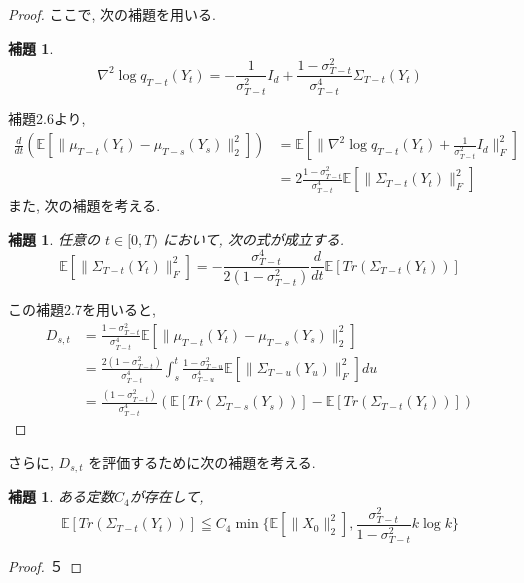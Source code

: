 \documentclass[11pt,a4paper]{ltjsarticle}
\newtheorem{lemma}[theorem]{補題}
\theoremstyle{remark}
\begin{document}
\begin{proof}
    ここで, 次の補題を用いる.
    \begin{lemma}
        \begin{equation}
            \nabla^2\log{q_{T-t}(Y_t)}=-\frac{1}{\sigma^2_{T-t}}I_d+\frac{1-\sigma^2_{T-t}}{\sigma^4_{T-t}}\Sigma_{T-t}(Y_t)
        \end{equation}
    \end{lemma}
    補題2.6より, 
    \begin{align}
            \frac{d}{dt}(\mathbb{E}[\|\mu_{T-t}(Y_t)-\mu_{T-s}(Y_s)\|^2_2])&=\mathbb{E}[\|\nabla^2\log{q_{T-t}(Y_t)+\frac{1}{\sigma^2_{T-t}}I_d}\|^2_F]\\
            &=2\frac{1-\sigma^2_{T-t}}{\sigma^4_{T-t}}\mathbb{E}[\|\Sigma_{T-t}(Y_t)\|^2_F]
    \end{align}
    また, 次の補題を考える.
    \begin{lemma}
        任意の $t\in[0,T)$ において, 次の式が成立する.
        \begin{equation}
            \mathbb{E}[\|\Sigma_{T-t}(Y_t)\|^2_F]=-\frac{\sigma^4_{T-t}}{2(1-\sigma^2_{T-t})}\frac{d}{dt}\mathbb{E}[Tr(\Sigma_{T-t}(Y_t))]
        \end{equation}
    \end{lemma}
    この補題2.7を用いると, 
    \begin{align}
        D_{s,t}&=\frac{1-\sigma^2_{T-t}}{\sigma^4_{T-t}}\mathbb{E}[\|\mu_{T-t}(Y_t)-\mu_{T-s}(Y_s)\|^2_2]\\
        &=\frac{2(1-\sigma^2_{T-t})}{\sigma^4_{T-t}}\int_{s}^{t}\frac{1-\sigma^2_{T-u}}{\sigma^4_{T-u}}\mathbb{E}[\|\Sigma_{T-u}(Y_u)\|^2_F]du\\
        &=\frac{(1-\sigma^2_{T-t})}{\sigma^4_{T-t}}(\mathbb{E}[Tr(\Sigma_{T-s}(Y_s))]-\mathbb{E}[Tr(\Sigma_{T-t}(Y_t))])
    \end{align}
\end{proof}
さらに, $D_{s,t}$ を評価するために次の補題を考える.
\begin{lemma}
    ある定数$C_4$が存在して, 
    \begin{equation}
        \mathbb{E}[Tr(\Sigma_{T-t}(Y_t))]\leqq C_4\min\{\mathbb{E}[\|X_0\|_2^2],\frac{\sigma^2_{T-t}}{1-\sigma^2_{T-t}}k\log{k}\}
    \end{equation}
\end{lemma}
\begin{proof}
    ５
\end{proof}
\end{document}
